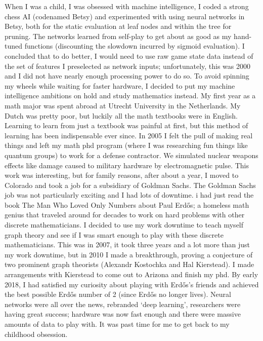 \documentclass{article}
\title{}
\author{Landon Rabern}
\begin{document}
\maketitle

When I was a child, I was obsessed with machine intelligence, I coded a strong chess AI (codenamed Betsy) and experimented with using neural networks in Betsy, both for the static evaluation at leaf nodes and within the tree for pruning. The networks learned from self-play to get about as good as my hand-tuned functions (discounting the slowdown incurred by sigmoid evaluation). I concluded that to do better, I would need to use raw game state data instead of the set of features I preselected as network inputs; unfortunately, this was 2000 and I did not have nearly enough processing power to do so. To avoid spinning my wheels while waiting for faster hardware, I decided to put my machine intelligence ambitions on hold and study mathematics instead. My first year as a math major was spent abroad at Utrecht University in the Netherlands. My Dutch was pretty poor, but luckily all the math textbooks were in English. Learning to learn from just a textbook was painful at first, but this method of learning has been indispensable ever since. In 2005 I felt the pull of making real things and left my math phd program (where I was researching fun things like quantum groups) to work for a defense contractor. We simulated nuclear weapons effects like damage caused to military hardware by electromagnetic pulse. This work was interesting, but for family reasons, after about a year, I moved to Colorado and took a job for a subsidiary of Goldman Sachs.
The Goldman Sachs job was not particularly exciting and I had lots of downtime. 
i had just read the book The Man Who Loved Only Numbers about Paul Erdős; a homeless math genius that traveled around for decades to work on hard problems with other discrete mathematicians. I decided to use my work downtime to teach myself graph theory and see if I was smart enough to play with these discrete mathematicians. 
This was in 2007, it took three years and a lot more than just my work downtime, but in 2010 I made a breakthrough, proving a conjecture of two prominent graph theorists (Alexandr Kostochka and Hal Kierstead). I made arrangements with Kierstead to come out to Arizona and finish my phd. By early 2018, I had satisfied my curiosity about playing with Erdős's friends and achieved the best possible Erdős number of 2 (since Erdős no longer lives). 
Neural networks were all over the news, rebranded `deep learning', researchers were having great success; hardware was now fast enough and there were massive amounts of data to play with. It was past time for me to get back to my childhood obsession.
\end{document}
